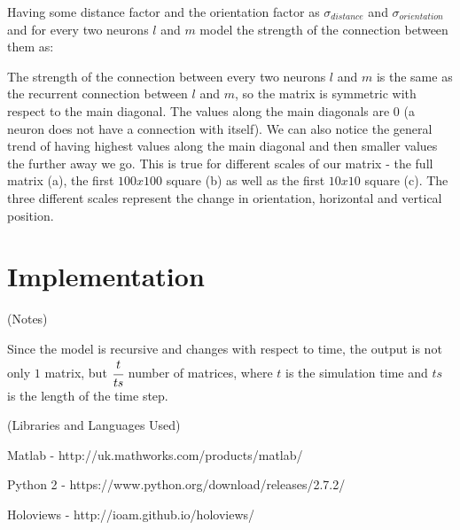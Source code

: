 Having some distance factor and the orientation factor as $\sigma_{distance}$ and $\sigma_{orientation}$ and for every two neurons $l$ and $m$ model the strength of the connection between them as:




The strength of the connection between every two neurons $l$ and $m$ is the same as the recurrent connection between $l$ and $m$, so the matrix is symmetric with respect to the main diagonal. The values along the main diagonals are $0$ (a neuron does not have a connection with itself). We can also notice the general trend of having highest values along the main diagonal and then smaller values the further away we go. This is true for different scales of our matrix - the full matrix (a), the first $100x100$ square (b) as well as the first $10x10$ square (c). The three different scales represent the change in orientation, horizontal and vertical position.








\chapter{Implementation}

(Notes)

Since the model is recursive and changes with respect to time, the output is not only $1$ matrix, but $\cfrac{t}{ts}$ number of matrices, where $t$ is the simulation time and $ts$ is the length of the time step.

(Libraries and Languages Used)

Matlab - http://uk.mathworks.com/products/matlab/

Python 2 - https://www.python.org/download/releases/2.7.2/

Holoviews - http://ioam.github.io/holoviews/

